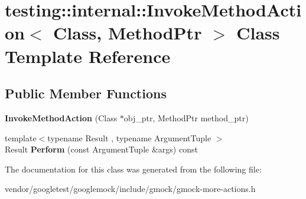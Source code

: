 \hypertarget{classtesting_1_1internal_1_1_invoke_method_action}{}\section{testing\+:\+:internal\+:\+:Invoke\+Method\+Action$<$ Class, Method\+Ptr $>$ Class Template Reference}
\label{classtesting_1_1internal_1_1_invoke_method_action}
\subsection*{Public Member Functions}
\begin{DoxyCompactItemize}
\item 
\mbox{\label{classtesting_1_1internal_1_1_invoke_method_action_a16e545f6166e2d54eeafdc2ab3adf06b}} 
{\bfseries Invoke\+Method\+Action} (Class $\ast$obj\+\_\+ptr, Method\+Ptr method\+\_\+ptr)
\item 
\mbox{\label{classtesting_1_1internal_1_1_invoke_method_action_aed6971c668bc2c7671d512306b25b1ab}} 
{\footnotesize template$<$typename Result , typename Argument\+Tuple $>$ }\\Result {\bfseries Perform} (const Argument\+Tuple \&args) const
\end{DoxyCompactItemize}


The documentation for this class was generated from the following file\+:\begin{DoxyCompactItemize}
\item 
vendor/googletest/googlemock/include/gmock/gmock-\/more-\/actions.\+h\end{DoxyCompactItemize}
